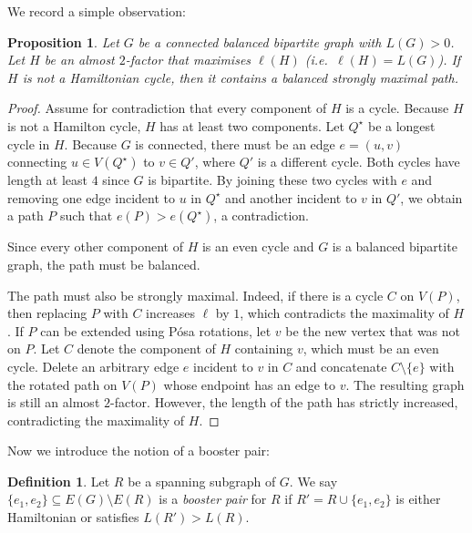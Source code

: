 \documentclass[reqno,final,a4paper]{amsart}
\numberwithin{equation}{section}
\newtheorem{proposition}[theorem]{Proposition}
\theoremstyle{definition}
\newtheorem{definition}[theorem]{Definition}
\theoremstyle{remark}
\begin{document}
We record a simple observation:
\begin{proposition}\label{prop:longest-path}
    Let $G$ be a connected balanced bipartite graph with $L(G) > 0$. Let $H$ be an almost $2$-factor that maximises $\ell(H)$ (i.e.\ $\ell(H) = L(G)$). If $H$ is not a Hamiltonian cycle, then it contains a balanced strongly maximal path.
\end{proposition}
\begin{proof}
    Assume for contradiction that every component of $H$ is a cycle. 
    Because $H$ is not a Hamilton cycle, $H$ has at least two components.
    Let $Q^\star$ be a longest cycle in $H$. Because $G$ is connected, there must be an edge $e = (u,v)$ connecting $u\in V(Q^\star)$ to $v\in Q'$, where $Q'$ is a different cycle.
     Both cycles have length at least $4$ since $G$ is bipartite.
     By joining these two cycles with $e$ and removing one edge incident to $u$ in $Q^\star$ and another incident to $v$ in $Q'$, we obtain a path $P$ such that $e(P) > e(Q^\star)$, a contradiction. 
     
     Since every other component of $H$ is an even cycle and $G$ is a balanced bipartite graph, the path must be balanced. 
     
     The path must also be strongly maximal. 
     Indeed, if there is a cycle $C$ on $V(P)$, then replacing $P$ with $C$ increases $\ell$ by $1$, which contradicts the maximality of $H$. 
     If $P$ can be extended using P\'{o}sa rotations, let $v$ be the new vertex that was not on $P$. Let $C$ denote the component of $H$ containing $v$, which must be an even cycle. 
     Delete an arbitrary edge $e$ incident to $v$ in $C$ and concatenate $C\setminus \{e\}$ with the rotated path on $V(P)$ whose endpoint has an edge to $v$. The resulting graph is still an almost $2$-factor. However, the length of the path has strictly increased, contradicting the maximality of $H$.
\end{proof}

Now we introduce the notion of a booster pair:
\begin{definition}
    Let $R$ be a spanning subgraph of $G$. We say $\{e_1,e_2\}\subseteq E(G)\setminus E(R)$ is a \emph{booster pair} for $R$ if $R' = R\cup \{e_1,e_2\}$ is either Hamiltonian or satisfies $L(R')> L(R)$.
\end{definition}
\end{document}
